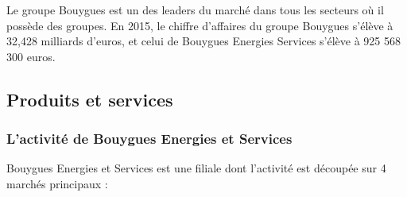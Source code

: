 \documentclass[a4paper]{article}
\begin{document}
    \vfill

    Le groupe Bouygues est un des leaders du marché dans tous les secteurs où il possède des groupes. En 2015, le chiffre d’affaires du groupe Bouygues s’élève à 32,428 milliards d’euros, et celui de Bouygues Energies Services s'élève à 925 568 300 euros. \\

    \vfill 

    \newpage

    \subsection{Produits et services}
 
    \subsubsection{L'activité de Bouygues Energies et Services}
    Bouygues Energies et Services est une filiale dont l'activité est découpée sur 4 marchés principaux : \\
    
\end{document}
